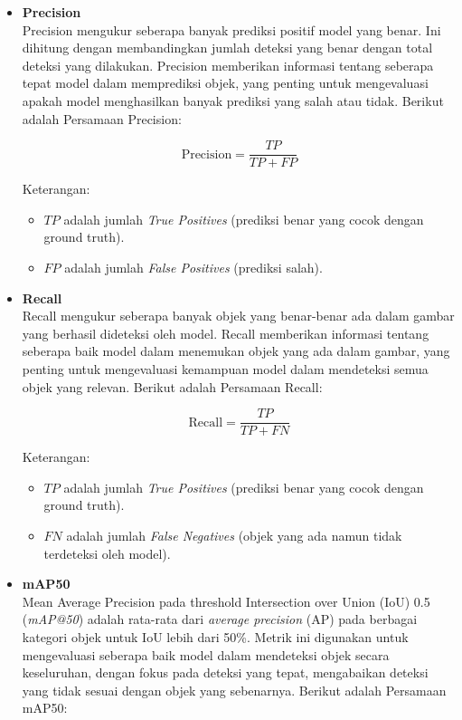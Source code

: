 \documentclass[journal,article,submit,pdftex,moreauthors]{Definitions/mdpi}
\begin{document}
\begin{itemize}
     \item \textbf{Precision} \\
    Precision mengukur seberapa banyak prediksi positif model yang benar. Ini dihitung dengan membandingkan jumlah deteksi yang benar dengan total deteksi yang dilakukan. Precision memberikan informasi tentang seberapa tepat model dalam memprediksi objek, yang penting untuk mengevaluasi apakah model menghasilkan banyak prediksi yang salah atau tidak\cite{Zhang2021}. Berikut adalah Persamaan Precision:
    
    \[
        \text{Precision} = \frac{TP}{TP + FP}
    \]
    
    Keterangan:
    \begin{itemize}
        \setlength{\itemindent}{1em} %
        \item \( TP \) adalah jumlah \textit{True Positives} (prediksi benar yang cocok dengan ground truth).
         \item \( FP \) adalah jumlah \textit{False Positives} (prediksi salah).
    \end{itemize}
    

    \item \textbf{Recall} \\
    Recall mengukur seberapa banyak objek yang benar-benar ada dalam gambar yang berhasil dideteksi oleh model. Recall memberikan informasi tentang seberapa baik model dalam menemukan objek yang ada dalam gambar, yang penting untuk mengevaluasi kemampuan model dalam mendeteksi semua objek yang relevan\cite{Zhang2021}. Berikut adalah Persamaan Recall:
    
    \[
        \text{Recall} = \frac{TP}{TP + FN}
    \]
    
    Keterangan:
    \begin{itemize}
        \setlength{\itemindent}{1em} %
         \item \( TP \) adalah jumlah \textit{True Positives} (prediksi benar yang cocok dengan ground truth).
    \item \( FN \) adalah jumlah \textit{False Negatives} (objek yang ada namun tidak terdeteksi oleh model).
    \end{itemize}

    \item \textbf{mAP50} \\
    Mean Average Precision pada threshold Intersection over Union (IoU) 0.5 (\textit{mAP@50}) adalah rata-rata dari \textit{average precision} (AP) pada berbagai kategori objek untuk IoU lebih dari 50\%. Metrik ini digunakan untuk mengevaluasi seberapa baik model dalam mendeteksi objek secara keseluruhan, dengan fokus pada deteksi yang tepat, mengabaikan deteksi yang tidak sesuai dengan objek yang sebenarnya\cite{Zhang2021}. Berikut adalah Persamaan mAP50:
    

\end{itemize}
\end{document}
